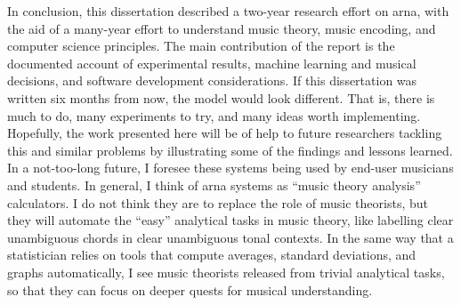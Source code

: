 
In conclusion, this dissertation described a two-year
research effort on \gls{arna}, with the aid of a many-year
effort to understand music theory, music encoding, and
computer science principles. The main contribution of the
report is the documented account of experimental results,
machine learning and musical decisions, and software
development considerations. If this dissertation was written
six months from now, the model would look different. That
is, there is much to do, many experiments to try, and many
ideas worth implementing. Hopefully, the work presented here
will be of help to future researchers tackling this and
similar problems by illustrating some of the findings and
lessons learned. In a not-too-long future, I foresee these
systems being used by end-user musicians and students. In
general, I think of \gls{arna} systems as ``music theory
analysis'' calculators. I do not think they are to replace
the role of music theorists, but they will automate the
``easy'' analytical tasks in music theory, like labelling
clear unambiguous chords in clear unambiguous tonal
contexts. In the same way that a statistician relies on
tools that compute averages, standard deviations, and graphs
automatically, I see music theorists released from trivial
analytical tasks, so that they can focus on deeper quests
for musical understanding. 
